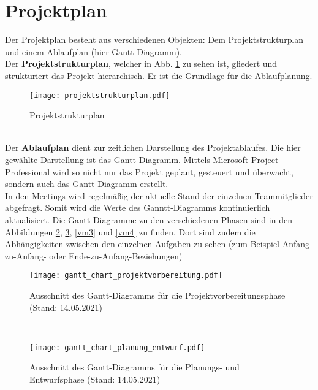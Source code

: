 \documentclass[../review_1.tex]{subfiles}
\begin{document}
\section{Projektplan}
Der Projektplan besteht aus verschiedenen Objekten: Dem Projektstrukturplan und einem Ablaufplan (hier Gantt-Diagramm).\\
Der \textbf{Projektstrukturplan}, welcher in Abb. \ref{projektstrukturplan} zu sehen ist, gliedert und strukturiert das Projekt hierarchisch. Er ist die Grundlage für die Ablaufplanung. 
\begin{figure} [h]
    \centering
    \texttt{[image: projektstrukturplan.pdf]}
    \caption{Projektstrukturplan}
    \label{projektstrukturplan}
\end{figure} \\
Der \textbf{Ablaufplan} dient zur zeitlichen Darstellung des Projektablaufes. Die hier gewählte Darstellung ist das Gantt-Diagramm. Mittels Microsoft Project Professional wird so nicht nur das Projekt geplant, gesteuert und überwacht, sondern auch das Gantt-Diagramm erstellt.\\ In den Meetings wird regelmäßig der aktuelle Stand der einzelnen Teammitglieder abgefragt. Somit wird die Werte des Ganntt-Diagramms  kontinuierlich aktualisiert. Die Gantt-Diagramme zu den verschiedenen Phasen sind in den Abbildungen \ref{vm1}, \ref{vm2}, \ref{vm3} und \ref{vm4} zu finden. Dort sind zudem die Abhängigkeiten zwischen den einzelnen Aufgaben zu sehen (zum Beispiel Anfang-zu-Anfang- oder Ende-zu-Anfang-Beziehungen)\\
\begin{figure} [h]
    \centering
    \texttt{[image: gantt\_chart\_projektvorbereitung.pdf]}
    \caption{Ausschnitt des Gantt-Diagramms für die Projektvorbereitungsphase (Stand: 14.05.2021)}     
    \label{vm1}
\end{figure}\\

\begin{figure} [h]
    \centering
    \vspace{-1cm}
    \texttt{[image: gantt\_chart\_planung\_entwurf.pdf]}
    \caption{Ausschnitt des Gantt-Diagramms für die Planungs- und Entwurfsphase (Stand: 14.05.2021)}
    \label{vm2}
\end{figure}
\end{document}
